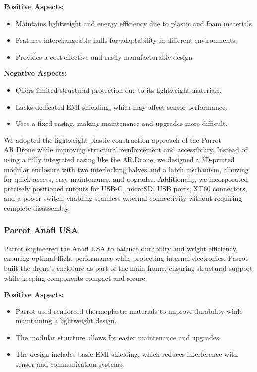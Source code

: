 \documentclass[12pt]{article}
\begin{document}
\textbf{Positive Aspects:}
\begin{itemize}
    \item Maintains lightweight and energy efficiency due to plastic and foam materials.
    \item Features interchangeable hulls for adaptability in different environments.
    \item Provides a cost-effective and easily manufacturable design.
\end{itemize}

\textbf{Negative Aspects:}
\begin{itemize}
    \item Offers limited structural protection due to its lightweight materials.
    \item Lacks dedicated EMI shielding, which may affect sensor performance.
    \item Uses a fixed casing, making maintenance and upgrades more difficult.
\end{itemize}

\par We adopted the lightweight plastic construction approach of the Parrot AR.Drone while improving structural reinforcement and accessibility. Instead of using a fully integrated casing like the AR.Drone, we designed a 3D-printed modular enclosure with two interlocking halves and a latch mechanism, allowing for quick access, easy maintenance, and upgrades. Additionally, we incorporated precisely positioned cutouts for USB-C, microSD, USB ports, XT60 connectors, and a power switch, enabling seamless external connectivity without requiring complete disassembly.

\subsubsection{Parrot Anafi USA}

\par Parrot engineered the Anafi USA to balance durability and weight efficiency, ensuring optimal flight performance while protecting internal electronics. Parrot built the drone’s enclosure as part of the main frame, ensuring structural support while keeping components compact and secure.

\textbf{Positive Aspects:}
\begin{itemize}
    \item Parrot used reinforced thermoplastic materials to improve durability while maintaining a lightweight design.
    \item The modular structure allows for easier maintenance and upgrades.
    \item The design includes basic EMI shielding, which reduces interference with sensor and communication systems.
\end{itemize}
\end{document}
